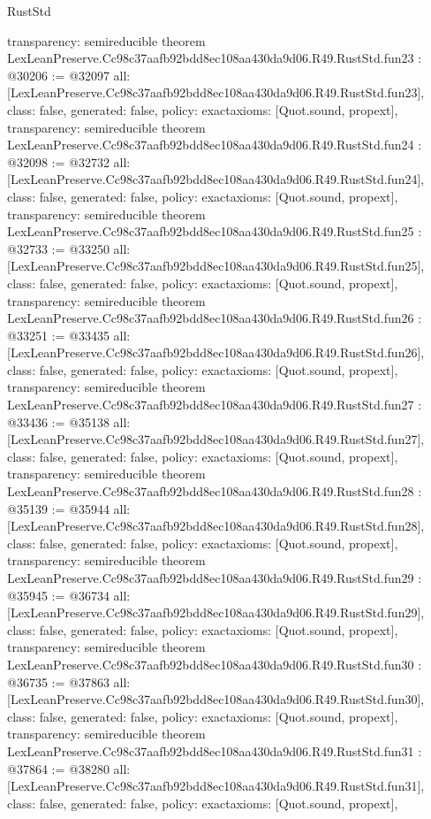 \begin{lexlean}{RustStd}
\begin{coremodule}
{  transparency: semireducible
}
theorem LexLeanPreserve.Cc98c37aafb92bdd8ec108aa430da9d06.R49.RustStd.fun23 : @30206 := @32097 {
  all: [LexLeanPreserve.Cc98c37aafb92bdd8ec108aa430da9d06.R49.RustStd.fun23],
  class: false,
  generated: false,
  policy: exact{axioms: [Quot.sound, propext]},
  transparency: semireducible
}
theorem LexLeanPreserve.Cc98c37aafb92bdd8ec108aa430da9d06.R49.RustStd.fun24 : @32098 := @32732 {
  all: [LexLeanPreserve.Cc98c37aafb92bdd8ec108aa430da9d06.R49.RustStd.fun24],
  class: false,
  generated: false,
  policy: exact{axioms: [Quot.sound, propext]},
  transparency: semireducible
}
theorem LexLeanPreserve.Cc98c37aafb92bdd8ec108aa430da9d06.R49.RustStd.fun25 : @32733 := @33250 {
  all: [LexLeanPreserve.Cc98c37aafb92bdd8ec108aa430da9d06.R49.RustStd.fun25],
  class: false,
  generated: false,
  policy: exact{axioms: [Quot.sound, propext]},
  transparency: semireducible
}
theorem LexLeanPreserve.Cc98c37aafb92bdd8ec108aa430da9d06.R49.RustStd.fun26 : @33251 := @33435 {
  all: [LexLeanPreserve.Cc98c37aafb92bdd8ec108aa430da9d06.R49.RustStd.fun26],
  class: false,
  generated: false,
  policy: exact{axioms: [Quot.sound, propext]},
  transparency: semireducible
}
theorem LexLeanPreserve.Cc98c37aafb92bdd8ec108aa430da9d06.R49.RustStd.fun27 : @33436 := @35138 {
  all: [LexLeanPreserve.Cc98c37aafb92bdd8ec108aa430da9d06.R49.RustStd.fun27],
  class: false,
  generated: false,
  policy: exact{axioms: [Quot.sound, propext]},
  transparency: semireducible
}
theorem LexLeanPreserve.Cc98c37aafb92bdd8ec108aa430da9d06.R49.RustStd.fun28 : @35139 := @35944 {
  all: [LexLeanPreserve.Cc98c37aafb92bdd8ec108aa430da9d06.R49.RustStd.fun28],
  class: false,
  generated: false,
  policy: exact{axioms: [Quot.sound, propext]},
  transparency: semireducible
}
theorem LexLeanPreserve.Cc98c37aafb92bdd8ec108aa430da9d06.R49.RustStd.fun29 : @35945 := @36734 {
  all: [LexLeanPreserve.Cc98c37aafb92bdd8ec108aa430da9d06.R49.RustStd.fun29],
  class: false,
  generated: false,
  policy: exact{axioms: [Quot.sound, propext]},
  transparency: semireducible
}
theorem LexLeanPreserve.Cc98c37aafb92bdd8ec108aa430da9d06.R49.RustStd.fun30 : @36735 := @37863 {
  all: [LexLeanPreserve.Cc98c37aafb92bdd8ec108aa430da9d06.R49.RustStd.fun30],
  class: false,
  generated: false,
  policy: exact{axioms: [Quot.sound, propext]},
  transparency: semireducible
}
theorem LexLeanPreserve.Cc98c37aafb92bdd8ec108aa430da9d06.R49.RustStd.fun31 : @37864 := @38280 {
  all: [LexLeanPreserve.Cc98c37aafb92bdd8ec108aa430da9d06.R49.RustStd.fun31],
  class: false,
  generated: false,
  policy: exact{axioms: [Quot.sound, propext]},
}
\end{coremodule}
\end{lexlean}
